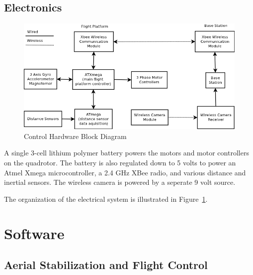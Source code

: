 \documentclass[12pt,letterpaper]{article}
\begin{document}
\subsection*{Electronics}

\begin{figure}[h!]
    \includegraphics[width=6in]{controlhardware.png}
    \caption{Control Hardware Block Diagram}
    \label{fig:el_blockdia}
\end{figure}

A single 3-cell lithium polymer battery powers the motors and motor controllers
on the quadrotor. The battery is also regulated down to 5 volts to power an
Atmel Xmega microcontroller, a 2.4 GHz XBee radio, and various distance
and inertial sensors. The wireless camera is powered by a seperate 9 volt
source.

The organization of the electrical system is illustrated in Figure~\ref{fig:el_blockdia}.


\section*{Software}

\subsection*{Aerial Stabilization and Flight Control}

\end{document}
